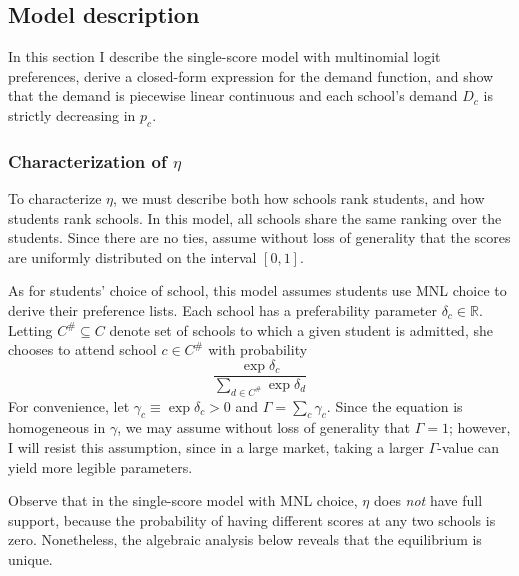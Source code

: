 \documentclass[12pt]{article}
\numberwithin{equation}{subsection}
\theoremstyle{definition}
\begin{document}
\subsection{Model description} 

In this section I describe the single-score model with multinomial logit preferences, derive a closed-form expression for the demand function, and show that the demand is piecewise linear continuous and each school's demand $D_c$ is strictly decreasing in $p_c$. 

\subsubsection{Characterization of $\eta$}
To characterize $\eta$, we must describe both how schools rank students, and how students rank schools. In this model, all schools share the same ranking over the students. Since there are no ties, assume without loss of generality that the scores are uniformly distributed on the interval $[0,1]$. 

As for students' choice of school, this model assumes students use MNL choice to derive their preference lists. Each school has a preferability parameter $\delta_c \in \mathbb{R}$. Letting $C^\# \subseteq C$ denote set of schools to which a given student is admitted, she chooses to attend school $c \in C^\#$ with probability
\[\frac{\exp \delta_c}{\sum_{d \in C^\#} \exp \delta_d}\]
For convenience, let $\gamma_c \equiv \exp \delta_c > 0$ and $\Gamma = \sum_c \gamma_c$. Since the equation is homogeneous in $\gamma$, we may assume without loss of generality that $\Gamma = 1$; however, I will resist this assumption, since in a large market, taking a larger $\Gamma$-value can yield more legible parameters. 

Observe that in the single-score model with MNL choice, $\eta$ does \emph{not} have full support, because the probability of having different scores at any two schools is zero. Nonetheless, the algebraic analysis below reveals that the equilibrium is unique.
\end{document}

